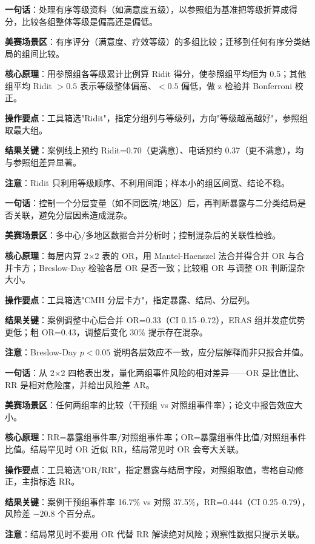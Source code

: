 
\begin{algobrief}
\textbf{一句话}：处理有序等级资料（如满意度五级），以参照组为基准把等级折算成得分，比较各组整体等级是偏高还是偏低。

\textbf{美赛场景区}：有序评分（满意度、疗效等级）的多组比较；迁移到任何有序分类结局的组间比较。

\textbf{核心原理}：用参照组各等级累计比例算 Ridit 得分，使参照组平均恒为 0.5；其他组平均 Ridit $>0.5$ 表示等级整体偏高、$<0.5$ 偏低，做 z 检验并 Bonferroni 校正。

\textbf{操作要点}：工具箱选"Ridit"，指定分组列与等级列，方向"等级越高越好"，参照组取最大组。

\textbf{结果关键}：案例线上预约 Ridit=0.70（更满意）、电话预约 0.37（更不满意），均与参照组差异显著。

\textbf{注意}：Ridit 只利用等级顺序、不利用间距；样本小的组区间宽、结论不稳。
\end{algobrief}


\begin{algobrief}
\textbf{一句话}：控制一个分层变量（如不同医院/地区）后，再判断暴露与二分类结局是否关联，避免分层因素造成混杂。

\textbf{美赛场景区}：多中心/多地区数据合并分析时；控制混杂后的关联性检验。

\textbf{核心原理}：每层内算 2$\times$2 表的 OR，用 Mantel-Haenszel 法合并得合并 OR 与合并卡方；Breslow-Day 检验各层 OR 是否一致；比较粗 OR 与调整 OR 判断混杂大小。

\textbf{操作要点}：工具箱选"CMH 分层卡方"，指定暴露、结局、分层列。

\textbf{结果关键}：案例调整中心后合并 OR=0.33（CI 0.15--0.72），ERAS 组并发症优势更低；粗 OR=0.43，调整后变化 30\% 提示存在混杂。

\textbf{注意}：Breslow-Day $p<0.05$ 说明各层效应不一致，应分层解释而非只报合并值。
\end{algobrief}


\begin{algobrief}
\textbf{一句话}：从 2$\times$2 四格表出发，量化两组事件风险的相对差异——OR 是比值比、RR 是相对危险度，并给出风险差 AR。

\textbf{美赛场景区}：任何两组率的比较（干预组 vs 对照组事件率）；论文中报告效应大小。

\textbf{核心原理}：RR=暴露组事件率/对照组事件率；OR=暴露组事件比值/对照组事件比值。结局罕见时 OR 近似 RR，结局常见时 OR 会夸大关联。

\textbf{操作要点}：工具箱选"OR/RR"，指定暴露与结局字段，对照组取值，零格自动修正，主指标选 RR。

\textbf{结果关键}：案例干预组事件率 16.7\% vs 对照 37.5\%，RR=0.444（CI 0.25--0.79），风险差 $-20.8$ 个百分点。

\textbf{注意}：结局常见时不要用 OR 代替 RR 解读绝对风险；观察性数据只提示关联。
\end{algobrief}

